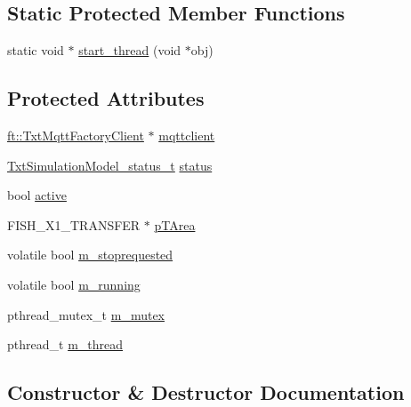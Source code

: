\subsection*{Static Protected Member Functions}
\begin{DoxyCompactItemize}
\item 
static void $\ast$ \hyperlink{classft_1_1_txt_simulation_model_a5755d7481ac5b46489e77227c63193a3}{start\+\_\+thread} (void $\ast$obj)
\end{DoxyCompactItemize}
\subsection*{Protected Attributes}
\begin{DoxyCompactItemize}
\item 
\hyperlink{classft_1_1_txt_mqtt_factory_client}{ft\+::\+Txt\+Mqtt\+Factory\+Client} $\ast$ \hyperlink{classft_1_1_txt_simulation_model_a6a92fdef8619b9b1636c7c464091ea3a}{mqttclient}
\item 
\hyperlink{namespaceft_a869be7c916433e2a139e184b05816c1a}{Txt\+Simulation\+Model\+\_\+status\+\_\+t} \hyperlink{classft_1_1_txt_simulation_model_a4c0085e8e3c63672a1cf4230d753c7b6}{status}
\item 
bool \hyperlink{classft_1_1_txt_simulation_model_a559548dedfcf86a7e1d50fad1028b5b4}{active}
\item 
F\+I\+S\+H\+\_\+\+X1\+\_\+\+T\+R\+A\+N\+S\+F\+ER $\ast$ \hyperlink{classft_1_1_txt_simulation_model_a9facd66a0dbecd676ae7b72c37a0b300}{p\+T\+Area}
\item 
volatile bool \hyperlink{classft_1_1_txt_simulation_model_a4b22060c42439cd42594dd483f6bb632}{m\+\_\+stoprequested}
\item 
volatile bool \hyperlink{classft_1_1_txt_simulation_model_a236eacb0b15504adcea2ed98d3b12029}{m\+\_\+running}
\item 
pthread\+\_\+mutex\+\_\+t \hyperlink{classft_1_1_txt_simulation_model_abe4279855fd9c51870c9d560d88df878}{m\+\_\+mutex}
\item 
pthread\+\_\+t \hyperlink{classft_1_1_txt_simulation_model_a18f478132d776bc303be7598a3fe32ba}{m\+\_\+thread}
\end{DoxyCompactItemize}


\subsection{Constructor \& Destructor Documentation}
